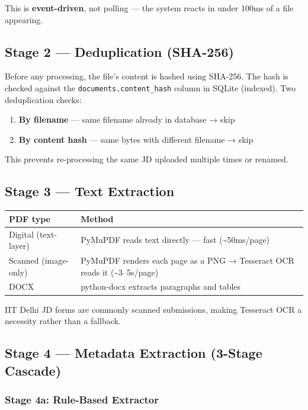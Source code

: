 \documentclass[12pt, a4paper]{article}
\begin{document}
This is \textbf{event-driven}, not polling --- the system reacts in under 100ms of a file appearing.

\subsection{Stage 2 --- Deduplication (SHA-256)}

Before any processing, the file's content is hashed using SHA-256. The hash is checked against the \texttt{documents.content\_hash} column in SQLite (indexed). Two deduplication checks:

\begin{enumerate}[noitemsep]
    \item \textbf{By filename} --- same filename already in database → skip
    \item \textbf{By content hash} --- same bytes with different filename → skip
\end{enumerate}

This prevents re-processing the same JD uploaded multiple times or renamed.

\subsection{Stage 3 --- Text Extraction}

\begin{tabularx}{\textwidth}{lX}
\toprule
\textbf{PDF type} & \textbf{Method} \\
\midrule
Digital (text-layer) & PyMuPDF reads text directly --- fast (\textasciitilde 50ms/page) \\
Scanned (image-only) & PyMuPDF renders each page as a PNG → Tesseract OCR reads it (\textasciitilde 3--5s/page) \\
DOCX & python-docx extracts paragraphs and tables \\
\bottomrule
\end{tabularx}

IIT Delhi JD forms are commonly scanned submissions, making Tesseract OCR a necessity rather than a fallback.

\subsection{Stage 4 --- Metadata Extraction (3-Stage Cascade)}

\subsubsection{Stage 4a: Rule-Based Extractor}
\end{document}
